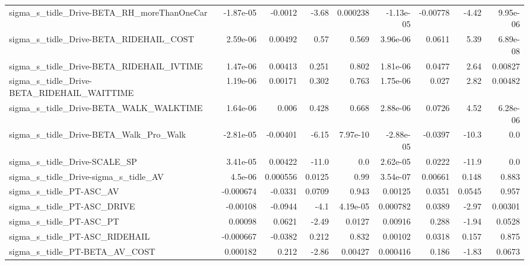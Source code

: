 \begin{tabular}{lrrrrrrrr}
sigma\_s\_tidle\_Drive-BETA\_RH\_moreThanOneCar         &   -1.87e-05 &      -0.0012 &     -3.68 & 0.000238 &  -1.13e-05 &    -0.00778 &        -4.42 &      9.95e-06 \\
sigma\_s\_tidle\_Drive-BETA\_RIDEHAIL\_COST             &    2.59e-06 &      0.00492 &      0.57 &    0.569 &   3.96e-06 &      0.0611 &         5.39 &      6.89e-08 \\
sigma\_s\_tidle\_Drive-BETA\_RIDEHAIL\_IVTIME           &    1.47e-06 &      0.00413 &     0.251 &    0.802 &   1.81e-06 &      0.0477 &         2.64 &       0.00827 \\
sigma\_s\_tidle\_Drive-BETA\_RIDEHAIL\_WAITTIME         &    1.19e-06 &      0.00171 &     0.302 &    0.763 &   1.75e-06 &       0.027 &         2.82 &       0.00482 \\
sigma\_s\_tidle\_Drive-BETA\_WALK\_WALKTIME             &    1.64e-06 &        0.006 &     0.428 &    0.668 &   2.88e-06 &      0.0726 &         4.52 &      6.28e-06 \\
sigma\_s\_tidle\_Drive-BETA\_Walk\_Pro\_Walk             &   -2.81e-05 &     -0.00401 &     -6.15 & 7.97e-10 &  -2.88e-05 &     -0.0397 &        -10.3 &           0.0 \\
sigma\_s\_tidle\_Drive-SCALE\_SP                       &    3.41e-05 &      0.00422 &     -11.0 &      0.0 &   2.62e-05 &      0.0222 &        -11.9 &           0.0 \\
sigma\_s\_tidle\_Drive-sigma\_s\_tidle\_AV               &     4.5e-06 &     0.000556 &    0.0125 &     0.99 &   3.54e-07 &     0.00661 &        0.148 &         0.883 \\
sigma\_s\_tidle\_PT-ASC\_AV                            &   -0.000674 &      -0.0331 &    0.0709 &    0.943 &    0.00125 &      0.0351 &       0.0545 &         0.957 \\
sigma\_s\_tidle\_PT-ASC\_DRIVE                         &    -0.00108 &      -0.0944 &      -4.1 & 4.19e-05 &   0.000782 &      0.0389 &        -2.97 &       0.00301 \\
sigma\_s\_tidle\_PT-ASC\_PT                            &     0.00098 &       0.0621 &     -2.49 &   0.0127 &    0.00916 &       0.288 &        -1.94 &        0.0528 \\
sigma\_s\_tidle\_PT-ASC\_RIDEHAIL                      &   -0.000667 &      -0.0382 &     0.212 &    0.832 &    0.00102 &      0.0318 &        0.157 &         0.875 \\
sigma\_s\_tidle\_PT-BETA\_AV\_COST                      &    0.000182 &        0.212 &     -2.86 &  0.00427 &   0.000416 &       0.186 &        -1.83 &        0.0673 \\

\end{tabular}
